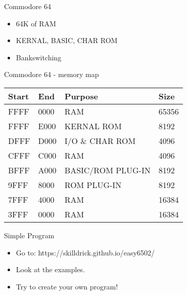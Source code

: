 \documentclass[aspectratio=43]{uva-inf-presentation}
\begin{document}

\begin{frame}{Commodore 64}

\begin{itemize}
\item 64K of RAM
\item KERNAL, BASIC, CHAR ROM
\item Bankswitching
\end{itemize}

\end{frame}


\begin{frame}{Commodore 64 - memory map}

\begin{tabular}{|l|l|l|l|}
\hline Start & End & Purpose & Size \\ \hline
FFFF & 0000 & RAM & 65356 \\
FFFF & E000 & KERNAL ROM & 8192 \\
DFFF & D000 & I/O \& CHAR ROM & 4096 \\
CFFF & C000 & RAM & 4096 \\
BFFF & A000 & BASIC/ROM PLUG-IN & 8192 \\
9FFF & 8000 & ROM PLUG-IN & 8192 \\
7FFF & 4000 & RAM & 16384 \\
3FFF & 0000 & RAM & 16384 \\ \hline
\end{tabular}

\end{frame}


\begin{frame}{Simple Program}

\begin{itemize}
\item Go to: https://skilldrick.github.io/easy6502/
\item Look at the examples.
\item Try to create your own program!
\end{itemize}


\end{frame}



\end{document}
